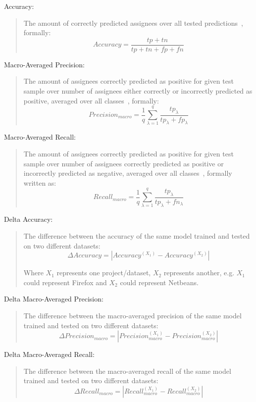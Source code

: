 \begin{framed}
  \hypertarget{metric:a}{Accuracy:}
  \begin{quote}
    The amount of correctly predicted assignees over all tested predictions~\cite{manning2008introduction}, formally:
    $$Accuracy = \frac{tp+tn}{tp+tn+fp+fn}$$
  \end{quote}

  \hypertarget{metric:p}{Macro-Averaged Precision:}
  \begin{quote}
    The amount of assignees correctly predicted as positive for given test sample over number of assignees either correctly or incorrectly predicted as positive, averaged over all classes~\cite{Asch2013}, formally:
    $$Precision_{macro} = \frac{1}{q}\sum_{\lambda=1}^q\frac{tp_{\lambda}}{tp_{\lambda}+fp_{\lambda}}$$
  \end{quote}

  \hypertarget{metric:r}{Macro-Averaged Recall:}
  \begin{quote}
    The amount of assignees correctly predicted as positive for given test sample over number of assignees correctly predicted as positive or incorrectly predicted as negative, averaged over all classes~\cite{Asch2013}, formally written as:
    $$Recall_{macro} = \frac{1}{q}\sum_{\lambda=1}^q\frac{tp_{\lambda}}{tp_{\lambda}+fn_{\lambda}}$$
  \end{quote}

  \hypertarget{metric:da}{Delta Accuracy:}
  \begin{quote}
    The difference between the accuracy of the same model trained and tested on two different datasets:
    $$\Delta Accuracy = |Accuracy^{(X_1)} - Accuracy^{(X_2)}|$$

    Where $X_1$ represents one project/dataset, $X_2$ represents another, e.g. $X_1$ could represent Firefox and $X_2$ could represent Netbeans.
  \end{quote}

  \hypertarget{metric:dp}{Delta Macro-Averaged Precision:}
  \begin{quote}
    The difference between the macro-averaged precision of the same model trained and tested on two different datasets:
    $$\Delta Precision_{macro} = |Precision_{macro}^{(X_1)} - Precision_{macro}^{(X_2)}|$$
  \end{quote}

  \hypertarget{metric:dr}{Delta Macro-Averaged Recall:}
  \begin{quote}
    The difference between the macro-averaged recall of the same model trained and tested on two different datasets:
    $$\Delta Recall_{macro} = |Recall_{macro}^{(X_1)} - Recall_{macro}^{(X_2)}|$$
  \end{quote}


\end{framed}
